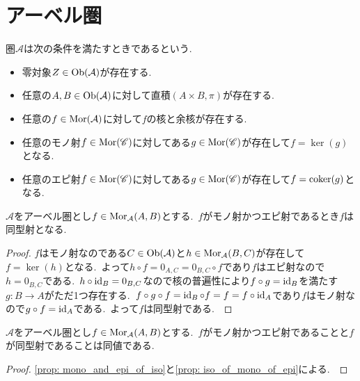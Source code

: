 
\section{アーベル圏}

\begin{definition} \label{def: IsAbelian}
圏$\mathcal{A}$は次の条件を満たすときであるという.
\begin{itemize}
    \item 零対象$Z \in \operatorname{Ob}(\mathcal{A})$が存在する.
    \item 任意の$A,B \in \operatorname{Ob}(\mathcal{A})$に対して直積$(A \times B, \pi)$が存在する.
    \item 任意の$f \in \operatorname{Mor}(\mathcal{A})$に対して$f$の核と余核が存在する.
    \item 任意のモノ射$f \in \operatorname{Mor}(\mathscr{C})$に対してある$g \in \operatorname{Mor}(\mathscr{C})$が存在して$f = \ker(g)$となる.
    \item 任意のエピ射$f \in \operatorname{Mor}(\mathscr{C})$に対してある$g \in \operatorname{Mor}(\mathscr{C})$が存在して$f = \operatorname{coker}(g)$となる.
\end{itemize}
\end{definition}

\begin{proposition} \label{prop: iso_of_mono_of_epi}
$\mathcal{A}$をアーベル圏とし$f \in \operatorname{Mor}_{\mathcal{A}}(A,B)$とする.\
$f$がモノ射かつエピ射であるとき$f$は同型射となる.\
\end{proposition}

\begin{proof}
$f$はモノ射なのである$C \in \operatorname{Ob}(\mathcal{A})$と$h \in \operatorname{Mor}_{\mathcal{A}}(B, C)$が存在して$f = \ker(h)$となる.\
よって$h \circ f = 0_{A,C} = 0_{B,C} \circ f$であり$f$はエピ射なので$h = 0_{B,C}$である.\
$h \circ \operatorname{id}_B = 0_{B,C}$なので核の普遍性により$f \circ g = \operatorname{id}_B$を満たす$g \colon B \to A$がただ1つ存在する.\
$f \circ g \circ f = \operatorname{id}_B \circ f = f = f \circ \operatorname{id}_A$であり$f$はモノ射なので$g \circ f = \operatorname{id}_A$である.\
よって$f$は同型射である.\
\end{proof}

\begin{corollary} \label{cor: iso_iff_mono_and_epi}
$\mathcal{A}$をアーベル圏とし$f \in \operatorname{Mor}_{\mathcal{A}}(A,B)$とする.\
$f$がモノ射かつエピ射であることと$f$が同型射であることは同値である.\
\end{corollary}

\begin{proof}
\cref{prop: mono_and_epi_of_iso}と\cref{prop: iso_of_mono_of_epi}による.\
\end{proof}

